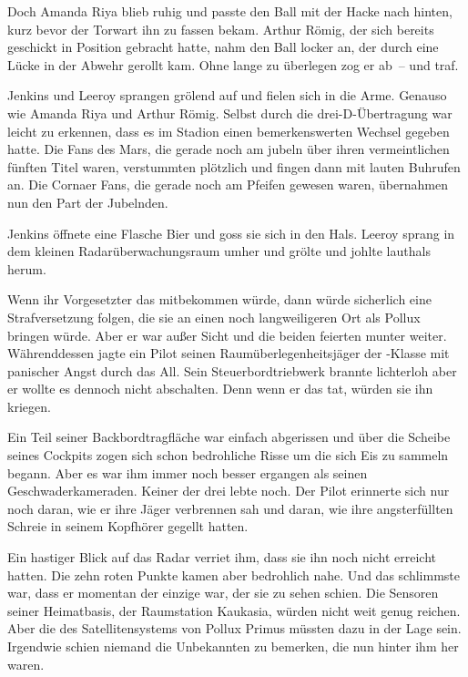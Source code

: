 \par

Doch Amanda Riya blieb ruhig und passte den Ball mit der Hacke nach hinten, kurz bevor der Torwart ihn zu fassen bekam. Arthur Römig, der sich bereits geschickt in Position gebracht hatte, nahm den Ball locker an, der durch eine Lücke in der Abwehr gerollt kam. Ohne lange zu überlegen zog er ab~-- und traf.

\par

Jenkins und Leeroy sprangen grölend auf und fielen sich in die Arme. Genauso wie Amanda Riya und Arthur Römig. Selbst durch die drei-D-Übertragung war leicht zu erkennen, dass es im Stadion einen bemerkenswerten Wechsel gegeben hatte. Die Fans des Mars, die gerade noch am jubeln über ihren vermeintlichen fünften Titel waren, verstummten plötzlich und fingen dann mit lauten Buhrufen an. Die Cornaer Fans, die gerade noch am Pfeifen gewesen waren, übernahmen nun den Part der Jubelnden.

\par

Jenkins öffnete eine Flasche Bier und goss sie sich in den Hals. Leeroy sprang in dem kleinen Radarüberwachungsraum umher und grölte und johlte lauthals herum.

\par

Wenn ihr Vorgesetzter das mitbekommen würde, dann würde sicherlich eine Strafversetzung folgen, die sie an einen noch langweiligeren Ort als Pollux bringen würde. Aber er war außer Sicht und die beiden feierten munter weiter.
\ortswechsel
Währenddessen jagte ein Pilot seinen Raumüberlegenheitsjäger der -Klasse mit panischer Angst durch das All. Sein Steuerbordtriebwerk brannte lichterloh aber er wollte es dennoch nicht abschalten. Denn wenn er das tat, würden sie ihn kriegen.

\par

Ein Teil seiner Backbordtragfläche war einfach abgerissen und über die Scheibe seines Cockpits zogen sich schon bedrohliche Risse um die sich Eis zu sammeln begann. Aber es war ihm immer noch besser ergangen als seinen Geschwaderkameraden. Keiner der drei lebte noch. Der Pilot erinnerte sich nur noch daran, wie er ihre Jäger verbrennen sah und daran, wie ihre angsterfüllten Schreie in seinem Kopfhörer gegellt hatten.

\par

Ein hastiger Blick auf das Radar verriet ihm, dass sie ihn noch nicht erreicht hatten. Die zehn roten Punkte kamen aber bedrohlich nahe. Und das schlimmste war, dass er momentan der einzige war, der sie zu sehen schien. Die Sensoren seiner Heimatbasis, der Raumstation Kaukasia, würden nicht weit genug reichen. Aber die des Satellitensystems von Pollux Primus müssten dazu in der Lage sein. Irgendwie schien niemand die Unbekannten zu bemerken, die nun hinter ihm her waren.


